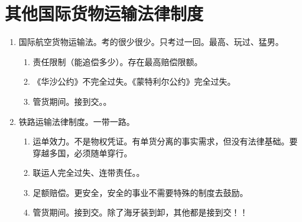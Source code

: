 \section{其他国际货物运输法律制度}
\begin{enumerate}
  \item 国际航空货物运输法。考的很少很少。只考过一回。最高、玩过、猛男。
        \begin{enumerate}
          \item 责任限制（能追偿多少）。存在最高赔偿限额。
          \item 《华沙公约》不完全过失。《蒙特利尔公约》完全过失。
          \item 管货期间。接到交。。
        \end{enumerate}
  \item 铁路运输法律制度。一带一路。
        \begin{enumerate}
          \item 运单效力。不是物权凭证。有单货分离的事实需求，但没有法律基础。要穿越多国，必须随单穿行。
          \item 联运人完全过失、连带责任。。
          \item 足额赔偿。更安全，安全的事业不需要特殊的制度去鼓励。
          \item 管货期间。接到交。除了海牙装到卸，其他都是接到交！！
        \end{enumerate}
\end{enumerate}
